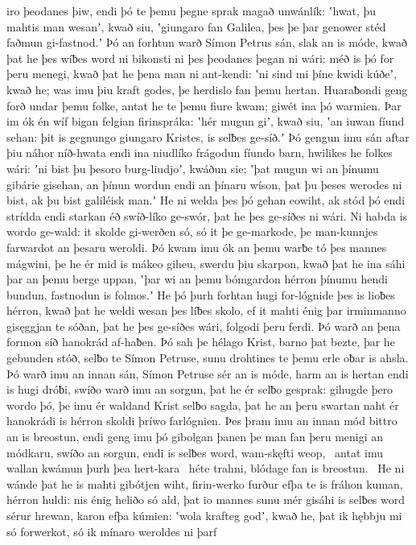 iro þeodanes þiw, endi þó te þemu þegne sprak
magað unwánlík: ʽhwat, þu mahtis man wesanʼ, kwað siu,
ʽgiungaro fan Galilea, þes þe þar genower stéd
faðmun gi-fastnod.ʼ Þó an forhtun warð
Símon Petrus sán, slak an is móde,
kwað þat he þes wíƀes word ni bikonsti
ni þes þeodanes þegan ni wári:
méð is þó for þeru menegi, kwað þat he þena man ni ant-kendi:
ʽni sind mi þíne kwidi kúðeʼ, kwað he; was imu þiu kraft godes,
þe herdislo fan þemu hertan. Huaraƀondi geng
forð undar þemu folke, antat he te þemu fiure kwam;
giwét ina þó warmien. Þar im ók én wíf bigan
felgian firinspráka: ʽhér mugun giʼ, kwað siu, ʽan iuwan fíund sehan:
þit is gegnungo giungaro Kristes,
is selƀes ge-síð.ʼ Þó gengun imu sán aftar þiu
náhor níð-hwata endi ina niudlíko
frágodun fíundo barn, hwilikes he folkes wári:
ʼni bist þu þesoro burg-liudjoʼ, kwáðun sie; ʽþat mugun wi an þínumu gibárie gisehan,
an þínun wordun endi an þínaru wíson, þat þu þeses werodes ni bist,
ak þu bist galiléisk man.ʼ He ni welda þes þó gehan eowiht,
ak stód þó endi strídda endi starkan éð
swíð-líko ge-swór, þat he þes ge-síðes ni wári.
Ni habda is wordo ge-wald: it skolde gi-werðen só,
só it þe ge-markode, þe man-kunnjes
farwardot an þesaru weroldi. Þó kwam imu ók an þemu warƀe tó
þes mannes mágwini, þe he ér mid is mákeo giheu,
swerdu þiu skarpon, kwað þat he ina sáhi þar
an þemu berge uppan, ʽþar wi an þemu bómgardon
hérron þínumu hendi bundun,
fastnodun is folmos.ʼ He þó þurh forhtan hugi
for-lógnide þes is lioƀes hérron, kwað þat he weldi wesan þes líƀes skolo,
ef it mahti énig þar irminmanno
gisęggjan te sóðan, þat he þes ge-síðes wári,
folgodi þeru ferdi. Þó warð an þena formon síð
hanokrád af-haƀen. Þó sah þe hélago Krist,
barno þat bezte, þar he gebunden stóð,
selƀo te Símon Petruse, sunu drohtines
te þemu erle oƀar is ahsla. Þó warð imu an innan sán,
Símon Petruse sér an is móde,
harm an is hertan endi is hugi dróƀi,
swíðo warð imu an sorgun, þat he ér selƀo gesprak:
gihugde þero wordo þó, þe imu ér waldand Krist
selƀo sagda, þat he an þeru swartan naht
ér hanokrádi is hérron skoldi
þríwo farlógnien. Þes þram imu an innan mód
bittro an is breostun, endi geng imu þó gibolgan þanen
þe man fan þeru menigi an módkaru,
swíðo an sorgun, endi is selƀes word,
wam-skęfti weop, \hld\ antat imu wallan kwámun
þurh þea hert-kara \hld\ héte trahni,
blódage fan is breostun. \hld\ He ni wánde þat he is mahti gibótjen wiht,
firin-werko furður efþa te is fráhon kuman,
hérron huldi: nis énig heliðo só ald,
þat io mannes sunu mér gisáhi
is selƀes word sérur hrewan,
karon efþa kúmien: ʽwola krafteg godʼ, kwað he,
þat ik hębbju mi só forwerkot, só ik mínaro weroldes ni þarf
